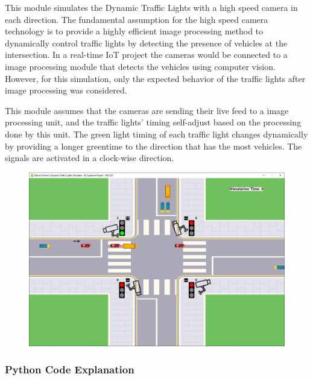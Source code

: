 \documentclass[12pt, a4paper,titlepage]{article}
\begin{document}
This module simulates the Dynamic Traffic Lights with a high speed camera in each direction. The fundamental assumption for the high speed camera technology is to provide a highly efficient image processing method to dynamically control traffic lights by detecting the presence of vehicles at the intersection. In a real-time IoT project the cameras would be connected to a image processing module that detects the vehicles using computer vision. However, for this simulation, only the expected behavior of the traffic lights after image processing was considered.

This module assumes that the cameras are sending their live feed to a image processing unit, and the traffic lights' timing self-adjust based on the processing done by this unit. The green light timing of each traffic light changes dynamically by providing a longer greentime to the direction that has the most vehicles. The signals are activated in a clock-wise direction.

\begin{figure}[H]
	\centering
	\includegraphics[width=\linewidth]{images/Camera}
	\caption{}
	\label{fig:camera}
\end{figure}

\subsubsection{Python Code Explanation}
\end{document}
